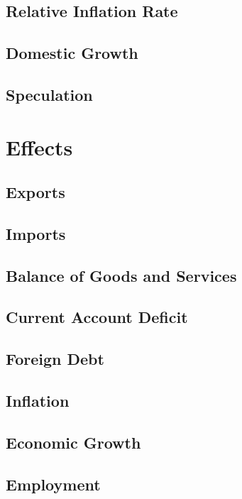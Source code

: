 \documentclass[a4paper,11pt]{article}
\begin{document}
\subsection{Relative Inflation Rate}

\subsection{Domestic Growth}

\subsection{Speculation}


\section{Effects}

\subsection{Exports}

\subsection{Imports}

\subsection{Balance of Goods and Services}

\subsection{Current Account Deficit}

\subsection{Foreign Debt}

\subsection{Inflation}

\subsection{Economic Growth}

\subsection{Employment}
\end{document}

